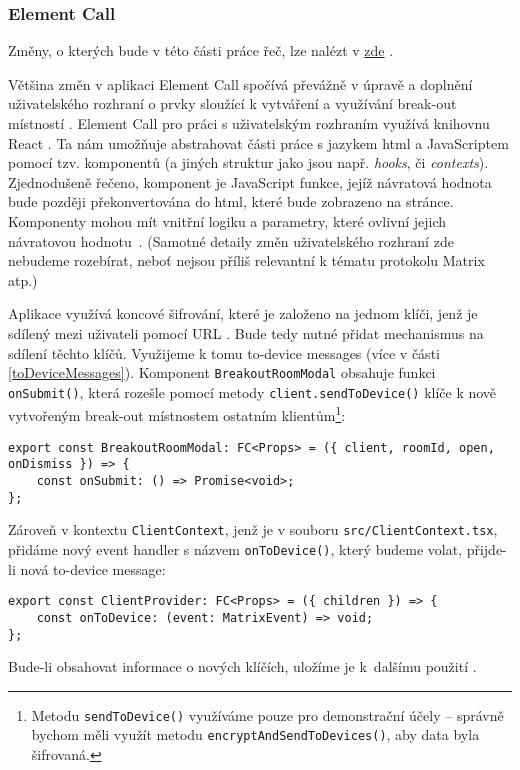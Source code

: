 \subsubsection{Element Call}

Změny, o kterých bude v této části práce řeč, lze nalézt v
\href{https://github.com/vector-im/element-call/pull/1615/}{zde}
\parencite{GitHub-ElementCall-BreakoutRooms}.

Většina změn v aplikaci Element Call spočívá převážně v úpravě a doplnění
uživatelského rozhraní o prvky sloužící k vytváření a využívání break-out
místností \parencite{GitHub-ElementCall-BreakoutRooms}. Element Call pro práci s
uživatelským rozhraním využívá knihovnu React \parencite{GitHub-ElementCall}. Ta
nám umožňuje abstrahovat části práce s jazykem \gls{html} a JavaScriptem pomocí
tzv. komponentů (a jiných struktur jako jsou např. \textit{hooks}, či
\textit{contexts}). Zjednodušeně řečeno, komponent je JavaScript funkce, jejíž
návratová hodnota bude později překonvertována do \gls{html}, které bude
zobrazeno na stránce. Komponenty mohou mít vnitřní logiku a parametry, které
ovlivní jejich návratovou hodnotu~\parencite{React-Homepage}. (Samotné detaily
změn uživatelského rozhraní zde nebudeme rozebírat, neboť nejsou příliš
relevantní k tématu protokolu Matrix atp.)

Aplikace využívá koncové šifrování, které je založeno na jednom klíči, jenž je
sdílený mezi uživateli pomocí URL
\parencite{GitHub-ElementCall-CompleteSPAE2EEWork}. Bude tedy nutné přidat
mechanismus na sdílení těchto klíčů. Využijeme k tomu to-device messages (více v
části \ref{toDeviceMessages}). Komponent
\texttt{BreakoutRoomModal} obsahuje funkci
\texttt{onSubmit()}, která rozešle pomocí metody
\texttt{client.sendToDevice()} klíče k nově vytvořeným break-out
místnostem ostatním klientům\footnote{Metodu
    \texttt{sendToDevice()} využíváme pouze pro demonstrační účely
    -- správně bychom měli využít metodu
    \texttt{encryptAndSendToDevices()}, aby data byla šifrovaná.}:

\begin{verbatim}
export const BreakoutRoomModal: FC<Props> = ({ client, roomId, open, onDismiss }) => {
	const onSubmit: () => Promise<void>;
};
\end{verbatim}

Zároveň v kontextu \texttt{ClientContext}, jenž je v souboru
\texttt{src/ClientContext.tsx}, přidáme nový event handler s názvem
\texttt{onToDevice()}, který budeme volat, přijde-li nová
to-device message:

\begin{verbatim}
export const ClientProvider: FC<Props> = ({ children }) => {
	const onToDevice: (event: MatrixEvent) => void;
};
\end{verbatim}

Bude-li obsahovat informace o nových klíčích, uložíme je
k~dalšímu použití \parencite{GitHub-ElementCall-BreakoutRooms}.

